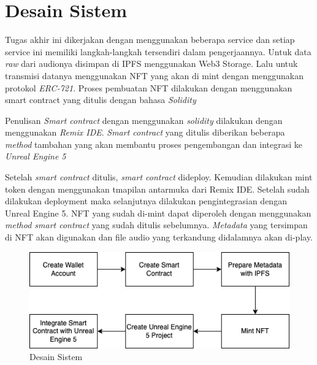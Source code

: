 \section{Desain Sistem}

Tugas akhir ini dikerjakan dengan menggunakan beberapa service dan setiap service ini memiliki langkah-langkah tersendiri dalam pengerjaannya.
Untuk data \emph{raw} dari audionya disimpan di IPFS menggunakan Web3 Storage. Lalu untuk transmisi datanya menggunakan NFT yang akan di mint
dengan menggunakan protokol \emph{ERC-721}. Proses pembuatan NFT dilakukan dengan menggunakan smart contract yang ditulis dengan bahasa \emph{Solidity}

Penulisan \emph{Smart contract} dengan menggunakan \emph{solidity} dilakukan dengan menggunakan \emph{Remix IDE}.
\emph{Smart contract} yang ditulis diberikan beberapa \emph{method} tambahan yang akan membantu proses pengembangan dan integrasi ke \emph{Unreal Engine 5}

Setelah \emph{smart contract} ditulis, \emph{smart contract} dideploy. Kemudian dilakukan mint token dengan menggunakan tmapilan antarmuka dari Remix IDE.
Setelah sudah dilakukan deployment maka selanjutnya dilakukan pengintegrasian dengan Unreal Engine 5. NFT yang sudah di-mint dapat diperoleh dengan menggunakan
\emph{method smart contract} yang sudah ditulis sebelumnya. \emph{Metadata} yang tersimpan di NFT akan digunakan dan file audio yang terkandung didalamnya akan
di-play.

\begin{figure}[H]
  \centering

  \includegraphics[scale=1]{gambar/desainsistem.png}

  \caption{Desain Sistem}
  \label{fig:desainsistem}
\end{figure}

